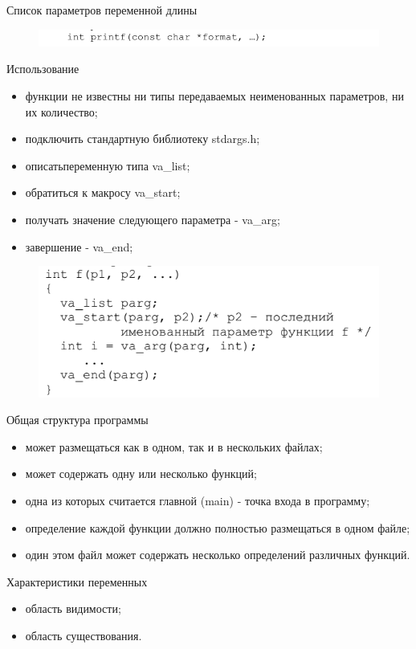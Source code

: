 \documentclass{beamer}
\begin{document}
\begin{frame}
Список параметров переменной длины
\begin{figure}[h]
\centering
\includegraphics[scale=0.5]{images/lec03-pic04.png}
\end{figure}
Использование

\begin{itemize}
\item функции не известны ни типы передаваемых неименованных параметров, ни их количество;
\item подключить стандартную библиотеку stdargs.h;
\item описатьпеременную типа va\_list;
\item обратиться к макросу va\_start;
\item получать значение следующего параметра - va\_arg;
\item завершение - va\_end;
\end{itemize}

\begin{figure}[h]
\centering
\includegraphics[scale=0.5]{images/lec03-pic05.png}
\end{figure}
\end{frame}

\begin{frame}
Общая структура программы
\begin{itemize}
\item может размещаться как в одном, так и в нескольких файлах;
\item может содержать одну или несколько функций;
\item одна из которых считается главной (main) - точка входа в программу;
\item определение каждой функции должно полностью размещаться в одном файле;
\item один этом файл может содержать несколько определений различных функций.
\end{itemize}
Характеристики переменных
\begin{itemize}
\item область видимости;
\item область существования.
\end{itemize}
\end{frame}
\end{document}
